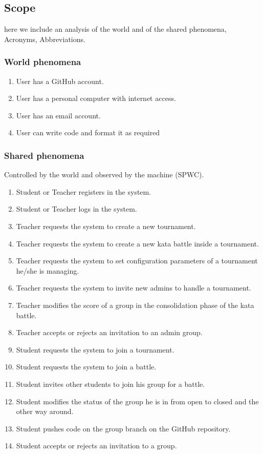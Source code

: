 \documentclass{article}
\begin{document}
    \subsection{Scope}
        here we include an analysis of the world and of the shared phenomena, Acronyms, Abbreviations.

        \subsubsection{World phenomena}
            \begin{enumerate}[label=\textbf{WP\arabic*}:, left=0pt]
                \item User has a GitHub account.
                \item User has a personal computer with internet access.
                \item User has an email account.
                \item User can write code and format it as required
            \end{enumerate}
        \subsubsection{Shared phenomena}
        Controlled by the world and observed by the machine (SPWC).

        \begin{enumerate}[label=\textbf{SPWC\arabic*}:, left=0pt]
            \item Student or Teacher registers in the system.
            \item Student or Teacher logs in the system.
            \item Teacher requests the system to create a new tournament.
            \item Teacher requests the system to create a new kata battle inside a tournament.
            \item Teacher requests the system to set configuration parameters of a tournament he/she is managing.
            \item Teacher requests the system to invite new admins to handle a tournament.
            \item Teacher modifies the score of a group in the consolidation phase of the kata battle.
            \item Teacher accepts or rejects an invitation to an admin group.
            \item Student requests the system to join a tournament.
            \item Student requests the system to join a battle.
            \item Student invites other students to join his group for a battle.
            \item Student modifies the status of the group he is in from open to closed and the other way around.
            \item Student pushes code on the group branch on the GitHub repository.
            \item Student accepts or rejects an invitation to a group.
        \end{enumerate}
\end{document}
